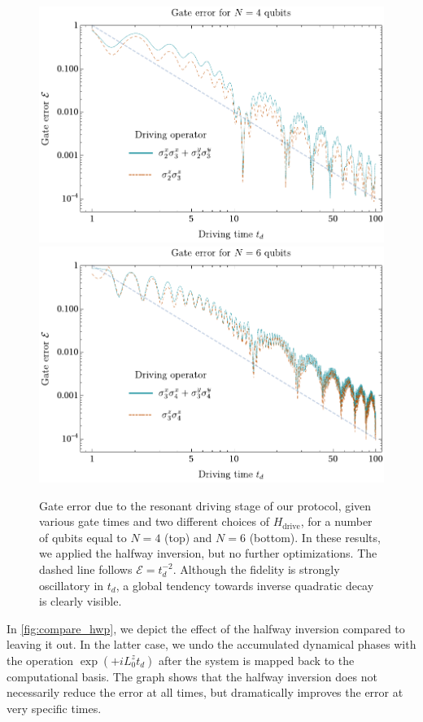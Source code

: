 \begin{figure}[p]
\centering
\includegraphics[width=.74\textwidth]{img/PolychronakosDriveFids4.pdf} 
\includegraphics[width=.74\textwidth]{img/PolychronakosDriveFids6.pdf}
\caption{Gate error due to the resonant driving stage of our protocol, given various gate times and two different choices of $H_\text{drive}$, for a number of qubits equal to $N=4$ (top) and $N=6$ (bottom). In these results, we applied the halfway inversion, but no further optimizations. The dashed line follows $\mathcal{E} = t_d^{-2}$. Although the fidelity is strongly oscillatory in $t_d$, a global tendency towards inverse quadratic decay is clearly visible.} %
\label{fig:drivefids}
\end{figure}

In \cref{fig:compare_hwp}, we depict the effect of the halfway inversion compared to leaving it out. In the latter case, we undo the accumulated dynamical phases with the operation $\exp( +i L^z_0 t_d)$ after the system is mapped back to the computational basis. The graph shows that the halfway inversion does not necessarily reduce the error at all times, but dramatically improves the error at very specific times. 

